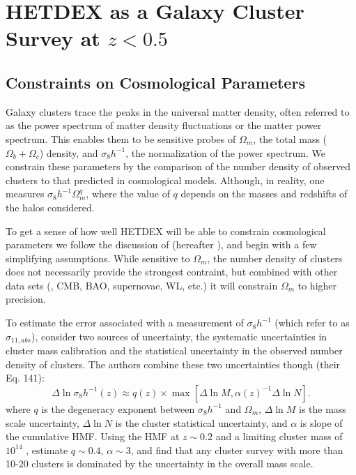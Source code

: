\documentclass[fleqn,usenatbib]{mnras}
\begin{document}
\section{HETDEX as a Galaxy Cluster Survey at $z < 0.5$}\label{sec:discussion}

\subsection{Constraints on Cosmological Parameters}
Galaxy clusters trace the peaks in the universal matter density, often referred to as the power spectrum of matter density fluctuations or the matter power spectrum. This enables them to be sensitive probes of $\Omega_m$, the total mass ($\Omega_b + \Omega_c$) density, and $\sigma_8h^{-1}$, the normalization of the power spectrum. We constrain these parameters by the comparison of the number density of observed clusters to that predicted in cosmological models. Although, in reality, one measures $\sigma_8h^{-1}\Omega_m^q$, where the value of $q$ depends on the masses and redshifts of the halos considered.

To get a sense of how well HETDEX will be able to constrain cosmological parameters we follow the discussion of \cite{Weinberg2013} (hereafter ), and begin with a few simplifying assumptions. While sensitive to $\Omega_m$, the number density of clusters does not necessarily provide the strongest contraint, but combined with other data sets (\eg, CMB, BAO, supernovae, WL, etc.) it will constrain $\Omega_m$ to higher precision.

To estimate the error associated with a measurement of $\sigma_8h^{-1}$ (which  refer to as $\sigma_{11,abs}$),  consider two sources of uncertainty, the systematic uncertainties in cluster mass calibration and the statistical uncertainty in the observed number density of clusters. The authors combine these two uncertainties though (their Eq. 141):
\begin{equation}
\Delta \ln \sigma_8h^{-1}(z) \approx q(z)\times 
        \max\left[ \Delta \ln M, \alpha(z)^{-1} \Delta \ln N \right].
\label{eq:sigElapprox}
\end{equation}
where $q$ is the degeneracy exponent between $\sigma_8h^{-1}$ and $\Omega_m$, $\Delta \ln M$ is the mass scale uncertainty, $\Delta \ln N$ is the cluster statistical uncertainty, and $\alpha$ is slope of the cumulative HMF. Using the \cite{Tinker2008} HMF at $z\sim0.2$ and a limiting cluster mass of $10^{14}$ \Msol,  estimate $q\sim0.4$, $\alpha\sim3$, and find that any cluster survey with more than 10-20 clusters is dominated by the uncertainty in the overall mass scale.
\end{document}

